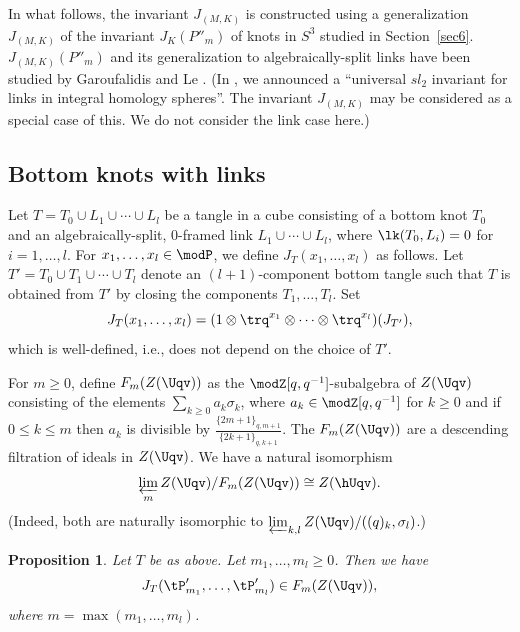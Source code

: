\documentclass{amsart}
\numberwithin{equation}{section}
\numberwithin{figure}{section}
\theoremstyle{plain}
\newtheorem{proposition}[theorem]{Proposition}
\theoremstyle{definition}
\theoremstyle{remark}
\begin{document}
In what follows, the invariant $J_{(M,K)}$ is constructed using a
generalization $J_{(M,K)}$ of the invariant $J_K(P''_m)$ of knots in
$S^3$ studied in Section~\ref{sec6}.  $J_{(M,K)}(P''_m)$ and its
generalization to algebraically-split links have been studied by
Garoufalidis and Le \cite{Garoufalidis-Le3}.  (In \cite[Section
4]{H:rims2001}, we announced a ``universal $sl_2$ invariant for links
in integral homology spheres''.  The invariant $J_{(M,K)}$ may be
considered as a special case of this.  We do not consider the link
case here.)

\subsection{Bottom knots with links}
\label{sec:bottom-knots-with}

Let $T=T_0\cup L_1\cup \cdots\cup L_l$ be a tangle in a cube consisting of a bottom
knot $T_0$ and an algebraically-split, $0$-framed link $L_1\cup \cdots\cup L_l$,
where $\lk(T_0,L_i)=0$ for $i=1,\ldots,l$.  For $x_1,\ldots,x_l\in \modP $, we
define $J_T(x_1,\ldots,x_l)$ as follows.  Let $T'=T_0\cup T_1\cup \cdots\cup T_l$
denote an $(l+1)$-component bottom tangle such that $T$ is obtained
from $T'$ by closing the components $T_1,\ldots,T_l$.  Set
\begin{equation*}
  J_T(x_1,\ldots,x_l) = (1\otimes \trq^{x_1}\otimes \cdots\otimes \trq^{x_l})(J_{T'}),
\end{equation*}
which is well-defined, i.e., does not depend on the choice of $T'$.

For $m\ge 0$, define $F_m(Z(\Uqv))$ as the $\modZ [q,q^{-1}]$-subalgebra of
$Z(\Uqv)$ consisting of the elements $\sum_{k\ge 0}a_k\sigma _k$, where
$a_k\in \modZ [q,q^{-1}]$ for $k\ge 0$ and if $0\le k\le m$ then $a_k$ is
divisible by $\frac{\{2m+1\}_{q,m+1}}{\{2k+1\}_{q,k+1}}$.  The
$F_m(Z(\Uqv))$ are a descending filtration of ideals in $Z(\Uqv)$.  We
have a natural isomorphism
\begin{equation*}
  \varprojlim_{m} Z(\Uqv)/F_{m}(Z(\Uqv)) \cong Z(\hUqv).
\end{equation*}
(Indeed, both are naturally isomorphic to $\varprojlim_{k,l}Z(\Uqv)/((q)_k,\sigma _l)$.)

\begin{proposition}
  \label{r76}
  Let $T$ be as above.  Let $m_1,\ldots,m_l\ge 0$.  Then we have
  \begin{equation*}
    J_{T}(\tP'_{m_1},\ldots,\tP'_{m_l})\in  F_m(Z(\Uqv)),
  \end{equation*}
  where $m=\max(m_1,\ldots,m_l)$.
\end{proposition}
\end{document}
